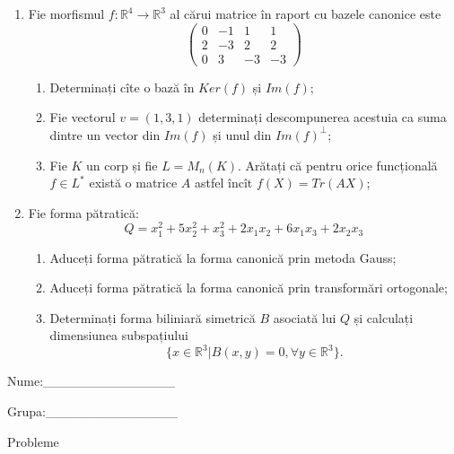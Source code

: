 \documentclass{article}
\begin{document}
\begin{enumerate}
 \item Fie morfismul $f:\mathbb{R}^4 \to \mathbb{R}^3$ al cărui matrice în raport cu bazele canonice este
$$\begin{pmatrix}
0&-1&1&1\\
2&-3&2&2\\
0&3&-3&-3
\end{pmatrix}$$

\begin{enumerate}
\item Determinați cîte o bază în $Ker(f)$ și $Im(f)$;
\item Fie vectorul $v=(1,3,1)$ determinați descompunerea acestuia ca suma dintre un vector din $Im(f)$ și unul din $Im(f)^\perp$;
\item Fie $K$ un corp și fie $L=M_n(K)$. Arătați că pentru orice funcțională $f \in L^*$ există o matrice $A$ astfel încît $f(X)=Tr(AX)$;
\end{enumerate}
\item Fie forma pătratică:
$$Q= x_1^2+5x_2^2+x_3^2+2x_1x_2+6x_1x_3+2x_2x_3$$

\begin{enumerate}
\item Aduceți forma pătratică la forma canonică prin metoda Gauss;
\item Aduceți forma pătratică la forma canonică prin transformări ortogonale;
\item Determinați forma biliniară simetrică $B$ asociată lui $Q$ și calculați dimensiunea subspațiului
$$\{x \in \mathbb{R}^3 | B(x,y)=0,\forall y \in \mathbb{R}^3\}.$$

\end{enumerate}
\end{enumerate}
\newpage
\begin{flushright}
Nume:\_\_\_\_\_\_\_\_\_\_\_\_\_\_
 
 
Grupa:\_\_\_\_\_\_\_\_\_\_\_\_\_\_
\end{flushright}
\begin{center}
\vspace{2cm}
{\Large Probleme}
\vspace{2cm}
\end{center}
\end{document}
